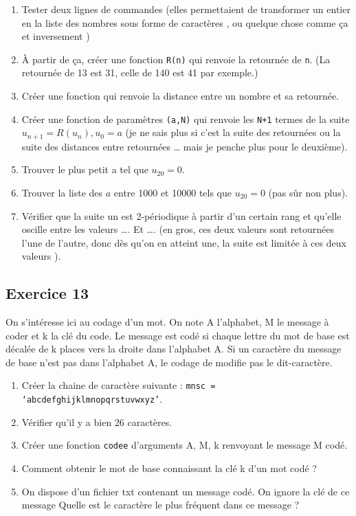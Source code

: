 \begin{enumerate}
\item Tester deux lignes de commandes (elles permettaient de transformer un entier en la liste des nombres sous forme de caractères , ou quelque chose comme ça et inversement )  
\item À partir de ça, créer une fonction \texttt{R(n)} qui renvoie la retournée de \texttt{n}. (La retournée de 13 est 31, celle de 140 est 41 par exemple.)
\item Créer une fonction qui renvoie la distance entre un nombre et sa retournée.
\item Créer une fonction de paramètres \texttt{(a,N)} qui renvoie les \texttt{N+1} termes de la suite $u_{n+1}=R(u_n), u_0=a$    (je ne sais plus si c’est la suite des retournées ou la suite des distances entre retournées … mais je penche plus pour le deuxième).
\item Trouver le plus petit a tel que $u_{20}= 0$.
\item Trouver la liste des $a$ entre 1000 et 10000 tels que $u_{20}= 0$ (pas sûr non plus).
\item Vérifier que la suite un est 2-périodique à partir d’un certain rang et qu’elle oscille entre les valeurs …. Et …. (en gros, ces deux valeurs sont retournées l’une de l’autre, donc dès qu’on en atteint une, la suite est limitée à ces deux valeurs ).
\end{enumerate}

\subsection*{Exercice 13}

On s’intéresse ici au codage d’un mot. On note A l’alphabet, M le message à coder et k la clé du code. Le message est codé si chaque lettre du mot de base est décalée de k places vers la droite dans l’alphabet A.
Si un caractère du message de base n’est pas dans l’alphabet A, le codage de modifie pas le dit-caractère.

\begin{enumerate}
\item Créer la chaine de caractère suivante : \texttt{mnsc = ‘abcdefghijklmnopqrstuvwxyz’}.
\item Vérifier qu’il y a bien 26 caractères.
\item Créer une fonction \texttt{codee} d’arguments A, M, k renvoyant le message M codé.
\item Comment obtenir le mot de base connaissant la clé k d’un mot codé ?
\item On dispose d’un fichier txt contenant un message codé. On ignore la clé de ce message
Quelle est le caractère le plus fréquent dans ce message ?
\end{enumerate}

